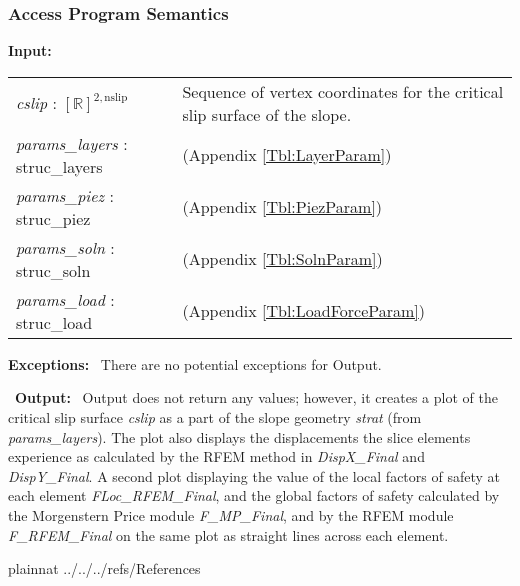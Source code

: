 \documentclass[12pt, titlepage]{article}
\begin{document}
\subsubsection{Access Program Semantics}
\textbf{Input:}
\renewcommand*{\arraystretch}{1.5}
\begin{longtable}{p{} p{}}
  \textit{cslip} : $[\mathbb{R}]^{2,\text{nslip}}$ & Sequence of
  vertex coordinates for the critical slip surface of the slope. \\
  
  \textit{params\_layers} : struc\_layers & (Appendix \ref{Tbl:LayerParam})\\
  
  \textit{params\_piez} : struc\_piez & (Appendix \ref{Tbl:PiezParam})\\

  \textit{params\_soln} : struc\_soln & (Appendix \ref{Tbl:SolnParam})\\
  
  \textit{params\_load} : struc\_load & (Appendix
  \ref{Tbl:LoadForceParam})\\
\end{longtable}

\noindent \textbf{Exceptions:} ~\newline\noindent There are no
potential exceptions for Output.

~\newline\noindent \textbf{Output:} ~\newline\noindent Output does not
return any values; however, it creates a plot of the critical slip
surface \textit{cslip} as a part of the slope geometry \textit{strat}
(from \textit{params\_layers}). The plot also displays the
displacements the slice elements experience as calculated by the RFEM
method in \textit{DispX\_Final} and \textit{DispY\_Final}. A second
plot displaying the value of the local factors of safety at each
element \textit{FLoc\_RFEM\_Final}, and the global factors of safety
calculated by the Morgenstern Price module \textit{F\_MP\_Final}, and
by the RFEM module \textit{F\_RFEM\_Final} on the same plot as
straight lines across each element.

\newpage

 {plainnat}
 {../../../refs/References}

\newpage

\end{document}
